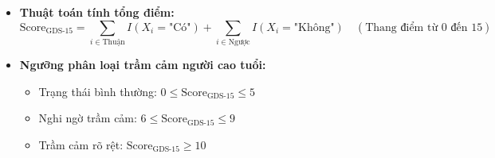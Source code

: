 \documentclass[12pt,a4paper]{article}
\begin{document}
\begin{itemize}
\begin{itemize}
        \item \textbf{Đối với 5 câu nghịch (đảo ngược)} (câu 1, 5, 7, 11, 13): Điểm cộng 1 nếu trả lời "Không".
    \end{itemize}
    \item \textbf{Thuật toán tính tổng điểm:}
    \begin{equation}
        \text{Score}_{\text{GDS-15}} = \sum_{i \in \text{Thuận}} I(X_i = \text{"Có"}) + \sum_{i \in \text{Ngược}} I(X_i = \text{"Không"}) \quad (\text{Thang điểm từ } 0 \text{ đến } 15)
    \end{equation}
    \item \textbf{Ngưỡng phân loại trầm cảm người cao tuổi:}
    \begin{itemize}
        \item Trạng thái bình thường: $0 \le \text{Score}_{\text{GDS-15}} \le 5$
        \item Nghi ngờ trầm cảm: $6 \le \text{Score}_{\text{GDS-15}} \le 9$
        \item Trầm cảm rõ rệt: $\text{Score}_{\text{GDS-15}} \ge 10$
    \end{itemize}
\end{itemize}
\end{document}
